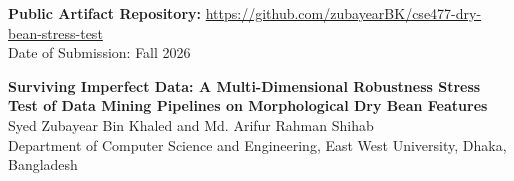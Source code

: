 \documentclass[11pt,a4paper]{article}
\begin{document}
\begin{titlepage}
    \vfill
    {\small \textbf{Public Artifact Repository:} \url{https://github.com/zubayearBK/cse477-dry-bean-stress-test}}\\[0.15cm]
    {\small Date of Submission: Fall 2026}
    \vspace*{0.5cm}
\end{titlepage}

\newpage
{}
\tableofcontents
\newpage
\listoffigures
\vspace{0.8cm}
\listoftables
\newpage

\setcounter{page}{1}

\begin{center}
    {\Large \textbf{Surviving Imperfect Data: A Multi-Dimensional Robustness Stress Test of Data Mining Pipelines on Morphological Dry Bean Features}}\\[0.4cm]
    {\large Syed Zubayear Bin Khaled \quad and \quad Md. Arifur Rahman Shihab}\\[0.2cm]
    {\small Department of Computer Science and Engineering, East West University, Dhaka, Bangladesh}\\[0.4cm]
\end{center}
\end{document}
